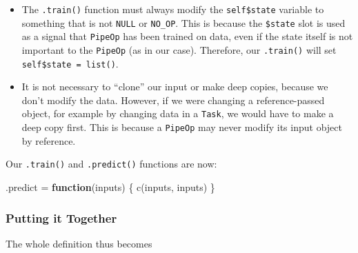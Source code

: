 \documentclass[
]{scrbook}
\newenvironment{Shaded}{\begin{snugshade}}{\end{snugshade}}
\newcommand{\ControlFlowTok}[1]{\textcolor[rgb]{0.13,0.29,0.53}{\textbf{#1}}}
\newcommand{\FunctionTok}[1]{\textcolor[rgb]{0.00,0.00,0.00}{#1}}
\newcommand{\NormalTok}[1]{#1}
\newcommand{\OtherTok}[1]{\textcolor[rgb]{0.56,0.35,0.01}{#1}}
\newcommand{\SpecialCharTok}[1]{\textcolor[rgb]{0.00,0.00,0.00}{#1}}
\renewenvironment{Shaded} {\begin{snugshade}\small} {\end{snugshade}}
\begin{document}
\begin{itemize}
\item
  The \texttt{.train()} function must always modify the \texttt{self\$state} variable to something that is not \texttt{NULL} or \texttt{NO\_OP}.
  This is because the \texttt{\$state} slot is used as a signal that \texttt{PipeOp} has been trained on data, even if the state itself is not important to the \texttt{PipeOp} (as in our case).
  Therefore, our \texttt{.train()} will set \texttt{self\$state\ =\ list()}.
\item
  It is not necessary to ``clone'' our input or make deep copies, because we don't modify the data.
  However, if we were changing a reference-passed object, for example by changing data in a \texttt{Task}, we would have to make a deep copy first.
  This is because a \texttt{PipeOp} may never modify its input object by reference.
\end{itemize}

Our \texttt{.train()} and \texttt{.predict()} functions are now:

\begin{Shaded}
\end{Shaded}

\begin{Shaded}
\begin{Highlighting}[]
\NormalTok{.predict }\OtherTok{=} \ControlFlowTok{function}\NormalTok{(inputs) \{}
  \FunctionTok{c}\NormalTok{(inputs, inputs)}
\NormalTok{\}}
\end{Highlighting}
\end{Shaded}

\hypertarget{putting-it-together}{%
\subsubsection{Putting it Together}\label{putting-it-together}}

The whole definition thus becomes
\end{document}
